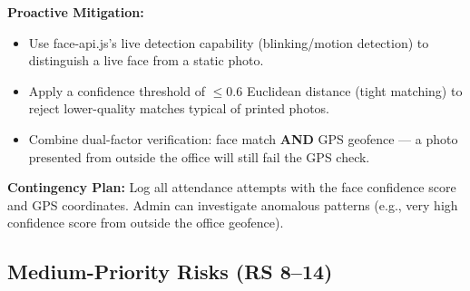 \documentclass[12pt,a4paper]{article}
\begin{document}
\textbf{Proactive Mitigation:}
\begin{itemize}[noitemsep]
    \item Use face-api.js's live detection capability (blinking/motion detection) to distinguish a live face from a static photo.
    \item Apply a confidence threshold of $\leq 0.6$ Euclidean distance (tight matching) to reject lower-quality matches typical of printed photos.
    \item Combine dual-factor verification: face match \textbf{AND} GPS geofence --- a photo presented from outside the office will still fail the GPS check.
\end{itemize}

\textbf{Contingency Plan:}
Log all attendance attempts with the face confidence score and GPS coordinates. Admin can investigate anomalous patterns (e.g., very high confidence score from outside the office geofence).

\subsection{Medium-Priority Risks (RS 8--14)}
\end{document}
